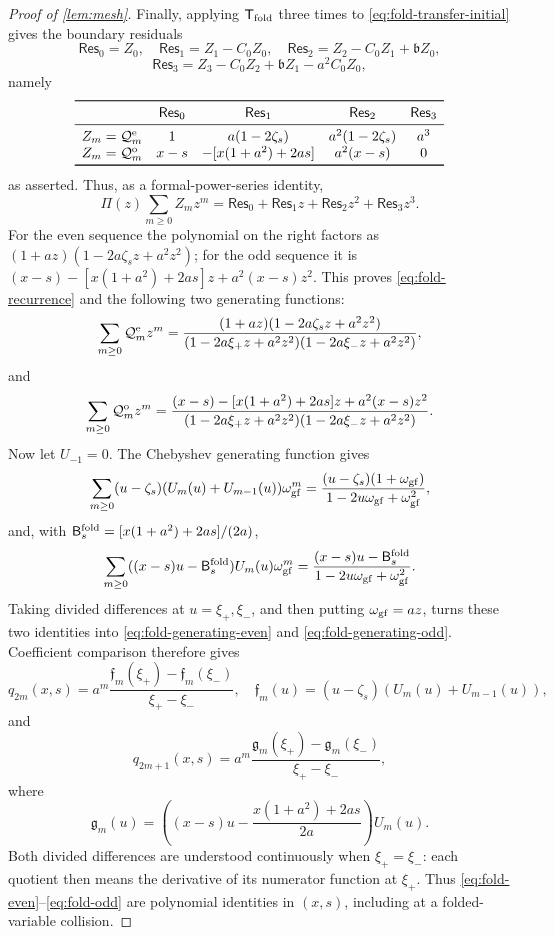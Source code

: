 \documentclass[review,hidelinks,onefignum,onetabnum]{siamart251216}
\begin{document}
\begin{proof}[Proof of \cref{lem:mesh}]
Finally, applying \(\mathsf T_{\rm fold}\) three times to
\eqref{eq:fold-transfer-initial} gives the boundary residuals
\[
 \mathsf{Res}_0=Z_0,\quad
 \mathsf{Res}_1=Z_1-C_0Z_0,\quad
 \mathsf{Res}_2=Z_2-C_0Z_1+\mathfrak bZ_0,
\]
\[
 \mathsf{Res}_3
 =Z_3-C_0Z_2+\mathfrak bZ_1-a^2C_0Z_0,
\]
namely
\[
\begin{array}{ccccc}
 \toprule
 &\mathsf{Res}_0&\mathsf{Res}_1&\mathsf{Res}_2&\mathsf{Res}_3\\ \midrule
 Z_m=\mathcal Q_m^{\rm e}
 &1&a(1-2\zeta_s)&a^2(1-2\zeta_s)&a^3\\
 Z_m=\mathcal Q_m^{\rm o}
 &x-s&-[x(1+a^2)+2as]&a^2(x-s)&0\\
 \bottomrule
\end{array}
\]
as asserted.
Thus, as a formal-power-series identity,
\[
 \Pi(z)\sum_{m\geq0}Z_mz^m
 =\mathsf{Res}_0+\mathsf{Res}_1z+\mathsf{Res}_2z^2+\mathsf{Res}_3z^3.
\]
For the even sequence the polynomial on the right factors as
\((1+az)(1-2a\zeta_sz+a^2z^2)\); for the odd sequence it is
\((x-s)-[x(1+a^2)+2as]z+a^2(x-s)z^2\).  This proves
\eqref{eq:fold-recurrence} and the following two generating functions:
\begin{equation}\label{eq:fold-generating-even}
 \sum_{m\geq0}\mathcal Q_m^{\rm e}z^m
 =\frac{(1+az)(1-2a\zeta_sz+a^2z^2)}
 {(1-2a\xi_+z+a^2z^2)(1-2a\xi_-z+a^2z^2)},
\end{equation}
and
\begin{equation}\label{eq:fold-generating-odd}
 \sum_{m\geq0}\mathcal Q_m^{\rm o}z^m
 =\frac{(x-s)-[x(1+a^2)+2as]z+a^2(x-s)z^2}
 {(1-2a\xi_+z+a^2z^2)(1-2a\xi_-z+a^2z^2)}.
\end{equation}
Now let \(U_{-1}=0\).  The Chebyshev generating function gives
\[
 \sum_{m\geq0}(u-\zeta_s)(U_m(u)+U_{m-1}(u))\omega_{\rm gf}^m
 =\frac{(u-\zeta_s)(1+\omega_{\rm gf})}
 {1-2u\omega_{\rm gf}+\omega_{\rm gf}^2},
\]
and, with \(\mathsf B_s^{\rm fold}=[x(1+a^2)+2as]/(2a)\),
\[
 \sum_{m\geq0}((x-s)u-\mathsf B_s^{\rm fold})U_m(u)\omega_{\rm gf}^m
 =\frac{(x-s)u-\mathsf B_s^{\rm fold}}
 {1-2u\omega_{\rm gf}+\omega_{\rm gf}^2}.
\]
Taking divided differences at \(u=\xi_+,\xi_-\), and then putting
\(\omega_{\rm gf}=az\), turns these two identities into
\eqref{eq:fold-generating-even} and \eqref{eq:fold-generating-odd}.
Coefficient comparison therefore gives
\begin{equation}\label{eq:fold-even}
 q_{2m}(x,s)=a^m
 \frac{\mathfrak f_m(\xi_+)-\mathfrak f_m(\xi_-)}{\xi_+-\xi_-},
 \quad
 \mathfrak f_m(u)=(u-\zeta_s)(U_m(u)+U_{m-1}(u)),
\end{equation}
and
\begin{equation}\label{eq:fold-odd}
 q_{2m+1}(x,s)=a^m
 \frac{\mathfrak g_m(\xi_+)-\mathfrak g_m(\xi_-)}{\xi_+-\xi_-},
\end{equation}
where
\[
 \mathfrak g_m(u)=\left((x-s)u-
 \frac{x(1+a^2)+2as}{2a}\right)U_m(u).
\]
Both divided differences are understood continuously when
\(\xi_+=\xi_-\): each quotient then means the derivative of its
numerator function at \(\xi_+\).  Thus
\eqref{eq:fold-even}--\eqref{eq:fold-odd} are
polynomial identities in \((x,s)\), including at a folded-variable
collision.


\end{proof}
\end{document}
